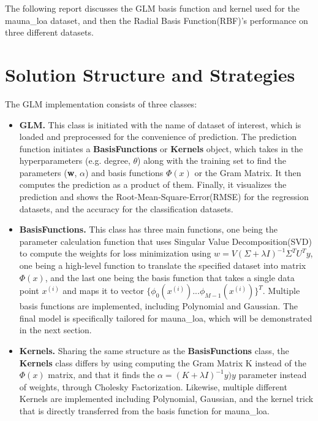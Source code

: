 \documentclass{article} %
\begin{document}
The following report discusses the GLM basis function and kernel used for the mauna\_loa dataset, and then the Radial Basis Function(RBF)'s performance on three different datasets.


\vspace{0.4cm}
\section*{Solution Structure and Strategies} %
The GLM implementation consists of three classes:
\begin{itemize}
  \item \textbf{GLM.} This class is initiated with the name of dataset of interest, which is loaded and preprocessed for the convenience of prediction. The prediction function initiates a \textbf{BasisFunctions} or \textbf{Kernels} object, which takes in the hyperparameters (e.g. degree, $\theta$) along with the training set to find the parameters (\textbf{w}, \textbf{$\alpha$}) and basis functions $\Phi(x)$ or the Gram Matrix. It then computes the prediction as a product of them. Finally, it visualizes the prediction and shows the Root-Mean-Square-Error(RMSE) for the regression datasets, and the accuracy for the classification datasets.

  \item \textbf{BasisFunctions.} This class has three main functions, one being the parameter calculation function that uses Singular Value Decomposition(SVD) to compute the weights for loss minimization using \textbf{$w = V(\Sigma+\lambda I)^{-1}\Sigma^TU^Ty$}, one being a high-level function to translate the specified dataset into matrix \textbf{$\Phi(x)$}, and the last one being the basis function that takes a single data point $x^{(i)}$ and maps it to vector $\{\phi_0(x^{(i)}) ... \phi_{M-1}(x^{(i)})\}^T$. Multiple basis functions are implemented, including Polynomial and Gaussian. The final model is specifically tailored for mauna\_loa, which will be demonstrated in the next section.

  \item \textbf{Kernels.} Sharing the same structure as the \textbf{BasisFunctions} class, the \textbf{Kernels} class differs by using computing the Gram Matrix K instead of the \textbf{$\Phi(x)$} matrix, and that it finds the $\alpha = (K+\lambda I)^{-1}y)y$ parameter instead of weights, through Cholesky Factorization. Likewise, multiple different Kernels are implemented including Polynomial, Gaussian, and the kernel trick that is directly transferred from the basis function for mauna\_loa.

\end{itemize}
\end{document}
